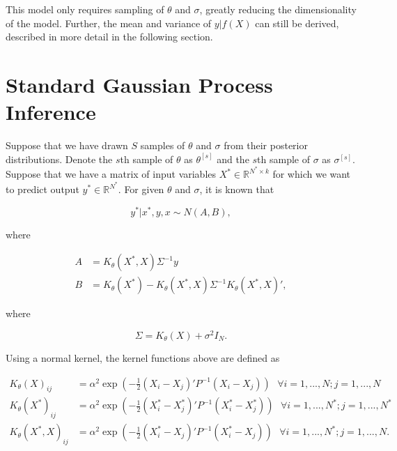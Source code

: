 \documentclass{article}
\newcommand{\RR}{\mathbb{R}}
\newcommand{\sample}[1]{#1^{[s]}}
\begin{document}
This model only requires sampling of $\theta$ and $\sigma$, greatly reducing the dimensionality of the model. Further, the mean and variance of $y|f(X)$ can still be derived, described in more detail in the following section.

\section{Standard Gaussian Process Inference}

Suppose that we have drawn $S$ samples of $\theta$ and $\sigma$ from their posterior distributions. Denote the $s$th sample of $\theta$ as $\sample{\theta}$ and the $s$th sample of $\sigma$ as $\sample{\sigma}$. Suppose that we have a matrix of input variables $X^*\in\RR^{N^*\times k}$ for which we want to predict output $y^*\in\RR^{N^*}$. For given $\theta$ and $\sigma$, it is known that

\begin{equation}
	y^*|x^*, y, x \sim N(A, B),
\end{equation}

\noindent where

\begin{subequations}
\begin{align}
	A &= K_\theta(X^*, X) \Sigma^{-1} y\\
	B &= K_\theta(X^*) - K_\theta(X^*, X) \Sigma^{-1} K_\theta(X^*, X)',
\end{align}
\end{subequations}

\noindent where 

\begin{equation}
	\Sigma = K_\theta(X) + \sigma^2 I_N.
\end{equation}

\noindent Using a normal kernel, the kernel functions above are defined as

\begin{subequations}
\begin{align}
	K_\theta(X)_{ij} &= \alpha^2 \exp\left(-\frac12 (X_i - X_j)' P^{-1} (X_i - X_j)\right)\mbox{\ \ \ \ }\forall i=1,...,N; j=1,...,N\\
	K_\theta(X^*)_{ij} &= \alpha^2 \exp\left(-\frac12 (X^*_i - X^*_j)' P^{-1} (X^*_i - X^*_j)\right)\mbox{\ \ \ \ }\forall i=1,...,N^*; j=1,...,N^*\\
	K_\theta(X^*, X)_{ij} &= \alpha^2 \exp\left(-\frac12 (X^*_i - X_j)' P^{-1} (X^*_i - X_j)\right)\mbox{\ \ \ \ }\forall i=1,...,N^*; j=1,...,N.
\end{align}
\end{subequations}
\end{document}
